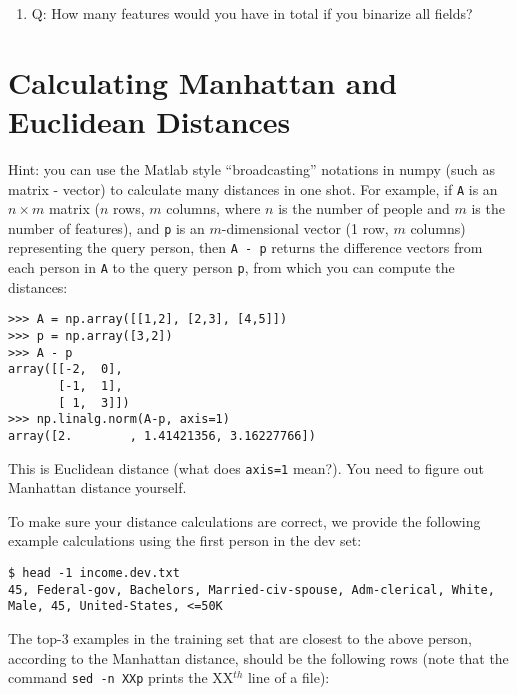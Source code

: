 \documentclass[11pt]{article}
\begin{document}
\begin{enumerate}
\item
  Q: How many features would you have in total if you binarize all fields?

\end{enumerate}




\section{Calculating Manhattan and Euclidean Distances}

Hint: you can use the Matlab style ``broadcasting'' notations in numpy (such as matrix - vector) 
to calculate many distances in one shot.  
For example, if \verb|A| is an $n \times m$ matrix ($n$ rows, $m$ columns, where $n$ is the number of people and $m$ is the number of features), and \verb|p| is an $m$-dimensional vector (1 row, $m$ columns) representing the query person, then \verb|A - p| returns the difference vectors from each person in \verb|A| to the query person \verb|p|, from which you can compute the distances:

\begin{verbatim}
>>> A = np.array([[1,2], [2,3], [4,5]])
>>> p = np.array([3,2])
>>> A - p
array([[-2,  0],
       [-1,  1],
       [ 1,  3]])
>>> np.linalg.norm(A-p, axis=1)
array([2.        , 1.41421356, 3.16227766])
\end{verbatim}

This is Euclidean distance (what does \verb|axis=1| mean?). You need to figure out Manhattan distance yourself.

To make sure your distance calculations are correct, we provide the following example calculations using the first person in the dev set:

\begin{verbatim}
$ head -1 income.dev.txt
45, Federal-gov, Bachelors, Married-civ-spouse, Adm-clerical, White, Male, 45, United-States, <=50K
\end{verbatim}

The top-3  examples in the training set that are closest to the above person, according to the Manhattan distance, should be the following rows
(note that the command \verb|sed -n XXp| prints the XX$^{th}$ line of a file):
\end{document}
